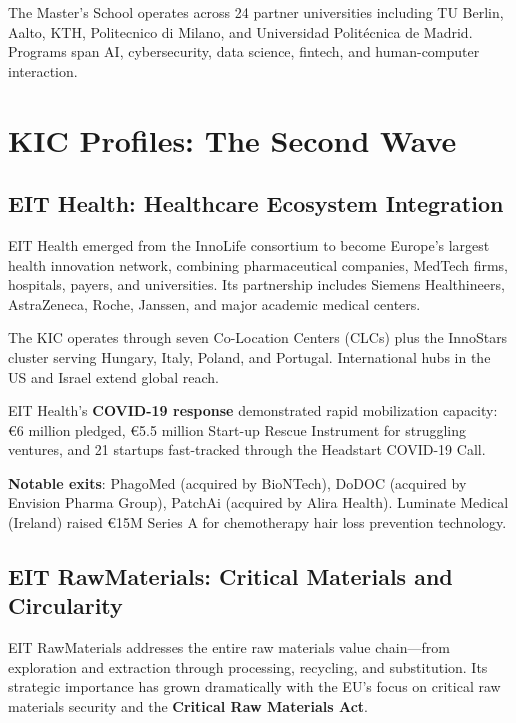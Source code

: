 \documentclass[../main.tex]{subfiles}
\begin{document}
The Master's School operates across 24 partner universities including TU Berlin, Aalto, KTH, Politecnico di Milano, and Universidad Politécnica de Madrid. Programs span AI, cybersecurity, data science, fintech, and human-computer interaction.


\section*{KIC Profiles: The Second Wave}

\subsection*{EIT Health: Healthcare Ecosystem Integration}

EIT Health emerged from the InnoLife consortium to become Europe's largest health innovation network, combining pharmaceutical companies, MedTech firms, hospitals, payers, and universities. Its partnership includes Siemens Healthineers, AstraZeneca, Roche, Janssen, and major academic medical centers.

The KIC operates through seven Co-Location Centers (CLCs) plus the InnoStars cluster serving Hungary, Italy, Poland, and Portugal. International hubs in the US and Israel extend global reach.

EIT Health's \textbf{COVID-19 response} demonstrated rapid mobilization capacity: €6 million pledged, €5.5 million Start-up Rescue Instrument for struggling ventures, and 21 startups fast-tracked through the Headstart COVID-19 Call.

\textbf{Notable exits}: PhagoMed (acquired by BioNTech), DoDOC (acquired by Envision Pharma Group), PatchAi (acquired by Alira Health). Luminate Medical (Ireland) raised €15M Series A for chemotherapy hair loss prevention technology.

\subsection*{EIT RawMaterials: Critical Materials and Circularity}

EIT RawMaterials addresses the entire raw materials value chain---from exploration and extraction through processing, recycling, and substitution. Its strategic importance has grown dramatically with the EU's focus on critical raw materials security and the \textbf{Critical Raw Materials Act}.
\end{document}
